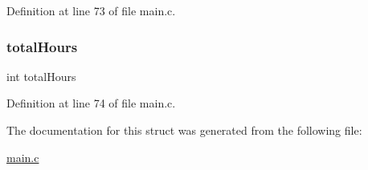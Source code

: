 Definition at line 73 of file main.\+c.

\hypertarget{structsubject_aaa60bc5447f40a6adeacbf85c02b69e2}{}\label{structsubject_aaa60bc5447f40a6adeacbf85c02b69e2} 
\subsubsection{\texorpdfstring{total\+Hours}{totalHours}}
{\footnotesize\ttfamily int total\+Hours}



Definition at line 74 of file main.\+c.



The documentation for this struct was generated from the following file\+:\begin{DoxyCompactItemize}
\item 
\hyperlink{main_8c}{main.\+c}\end{DoxyCompactItemize}
